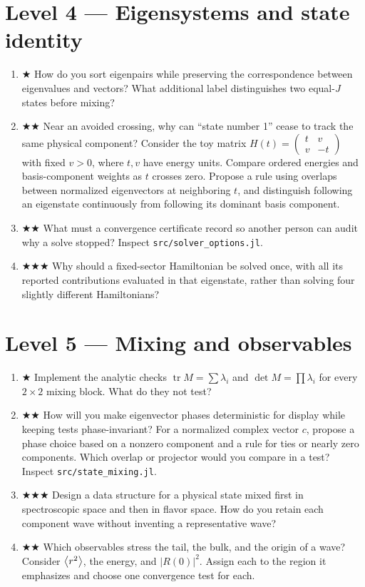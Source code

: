 \documentclass[11pt]{article}
\begin{document}
\section*{Level 4 — Eigensystems and state identity}
\begin{enumerate}[resume]
\item ★ How do you sort eigenpairs while preserving the correspondence between
eigenvalues and vectors? What additional label distinguishes two equal-$J$
states before mixing?
\item ★★ Near an avoided crossing, why can ``state number 1'' cease to track the
same physical component? Consider the toy matrix
$H(t)=\begin{pmatrix}t&v\\v&-t\end{pmatrix}$ with fixed $v>0$,
where $t,v$ have energy units. Compare ordered energies and basis-component
weights as $t$ crosses zero. Propose a rule using overlaps between normalized
eigenvectors at neighboring $t$, and distinguish following an eigenstate
continuously from following its dominant basis component.
\item ★★ What must a convergence certificate record so another person can audit
why a solve stopped? Inspect \texttt{src/solver\_options.jl}.
\item ★★★ Why should a fixed-sector Hamiltonian be solved once, with all its
reported contributions evaluated in that eigenstate, rather than solving four
slightly different Hamiltonians?
\end{enumerate}

\section*{Level 5 — Mixing and observables}
\begin{enumerate}[resume]
\item ★ Implement the analytic checks $\operatorname{tr}M=\sum\lambda_i$ and
$\det M=\prod\lambda_i$ for every $2\times2$ mixing block. What do they not test?
\item ★★ How will you make eigenvector phases deterministic for display while
keeping tests phase-invariant? For a normalized complex vector $c$, propose
a phase choice based on a nonzero component and a rule for ties or nearly zero
components. Which overlap or projector would you compare in a test? Inspect \texttt{src/state\_mixing.jl}.
\item ★★★ Design a data structure for a physical state mixed first in
spectroscopic space and then in flavor space. How do you retain each component
wave without inventing a representative wave?
\item ★★ Which observables stress the tail, the bulk, and the origin of a wave?
Consider $\left\langle r^2\right\rangle$, the energy, and $|R(0)|^2$.
Assign each to the region it emphasizes and choose one convergence test for each.
\end{enumerate}
\end{document}
